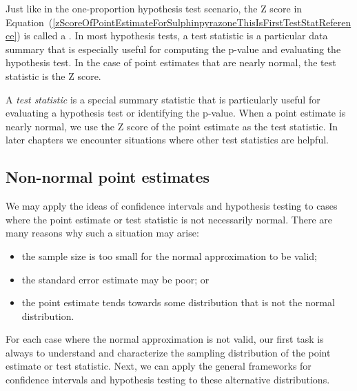Just like in the one-proportion hypothesis test scenario, the Z score in Equation~(\ref{zScoreOfPointEstimateForSulphinpyrazoneThisIsFirstTestStatReference}) is called a . In most hypothesis tests, a test statistic is a particular data summary that is especially useful for computing the p-value and evaluating the hypothesis test. In the case of point estimates that are nearly normal, the test statistic is the Z score.

\begin{termBox}{
A \emph{test statistic} is a special summary statistic that is particularly useful for evaluating a hypothesis test or identifying the p-value. When a point estimate is nearly normal, we use the Z score of the point estimate as the test statistic. In later chapters we encounter situations where other test statistics are helpful.}
\end{termBox}


\subsection{Non-normal point estimates}

We may apply the ideas of confidence intervals and hypothesis testing to cases where the point estimate or test statistic is not necessarily normal. There are many reasons why such a situation may arise:
\begin{itemize}
\setlength{\itemsep}{0mm}
\item the sample size is too small for the normal approximation to be valid;
\item the standard error estimate may be poor; or
\item the point estimate tends towards some distribution that is not the normal distribution.
\end{itemize}
For each case where the normal approximation is not valid, our first task is always to understand and characterize the sampling distribution of the point estimate or test statistic. Next, we can apply the general frameworks for confidence intervals and hypothesis testing to these alternative distributions.





